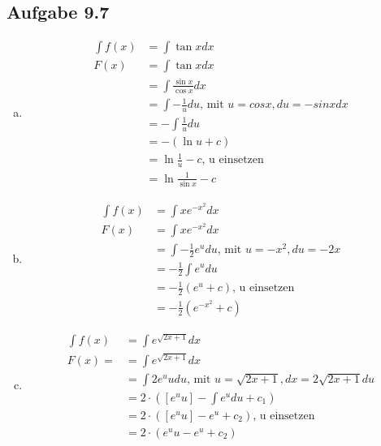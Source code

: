 \documentclass{standalone}
\begin{document}
\subsection{Aufgabe 9.7}

\begin{enumerate}[a)]
    \item \begin{align}
        \int f(x) &= \int \tan x dx \\
        F(x) &= \int \tan x  dx \\
        &= \int \frac{\sin x}{\cos x} dx \\
        &= \int -\frac{1}{u} du \text{, mit } u = cos x, du = -sin x dx \\
        &= -\int \frac{1}{u} du \\
        &= - (\ln u + c) \\
        &= \ln \frac{1}{u} - c \text{, u einsetzen} \\
        &= \ln \frac{1}{\sin x} - c
    \end{align}
    \item \begin{align}
        \int f(x) &= \int xe^{-x^2} dx \\
        F(x) &= \int xe^{-x^2} dx \\
        &= \int -\frac{1}{2}e^{u} du \text{, mit } u = -x^2, du = -2x \\
        &= -\frac{1}{2} \int e^{u} du \\
        &= -\frac{1}{2} (e^{u} + c) \text{, u einsetzen} \\
        &= -\frac{1}{2} (e^{-x^2} + c)
    \end{align}
    \item \begin{align}
        \int f(x) &= \int e^{\sqrt{2x+1}} dx \\
        F(x) = &= \int e^{\sqrt{2x+1}} dx\\
        &= \int 2e^{u}u du \text{, mit } u = \sqrt{2x+1}, dx = 2\sqrt{2x+1} du \\
        &= 2 \cdot ( \left[ e^{u}u \right] - \int e^{u} du + c_1) \\
        &= 2 \cdot ( \left[ e^{u}u \right] - e^{u} + c_2) \text{, u einsetzen} \\
        &= 2 \cdot (e^{u}u - e^{u} + c_2)
    \end{align}
\end{enumerate}
\end{document}
